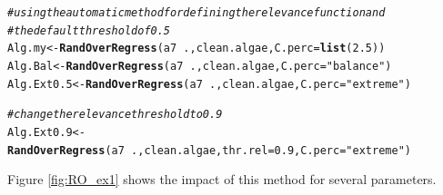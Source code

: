 \documentclass[10pt,a4paper]{article}\usepackage[]{graphicx}\usepackage[]{color}
\makeatletter
\newcommand{\hlnum}[1]{\textcolor[rgb]{0.686,0.059,0.569}{#1}}%
\newcommand{\hlstr}[1]{\textcolor[rgb]{0.192,0.494,0.8}{#1}}%
\newcommand{\hlcom}[1]{\textcolor[rgb]{0.678,0.584,0.686}{\textit{#1}}}%
\newcommand{\hlopt}[1]{\textcolor[rgb]{0,0,0}{#1}}%
\newcommand{\hlstd}[1]{\textcolor[rgb]{0.345,0.345,0.345}{#1}}%
\newcommand{\hlkwb}[1]{\textcolor[rgb]{0.69,0.353,0.396}{#1}}%
\newcommand{\hlkwc}[1]{\textcolor[rgb]{0.333,0.667,0.333}{#1}}%
\newcommand{\hlkwd}[1]{\textcolor[rgb]{0.737,0.353,0.396}{\textbf{#1}}}%
\newenvironment{kframe}{%
 \def\at@end@of@kframe{}%
 \ifinner\ifhmode%
  \def\at@end@of@kframe{\end{minipage}}%
  \begin{minipage}{\columnwidth}%
 \fi\fi%
 \def\FrameCommand##1{\hskip\@totalleftmargin \hskip-\fboxsep
 \colorbox{shadecolor}{##1}\hskip-\fboxsep
     \hskip-\linewidth \hskip-\@totalleftmargin \hskip\columnwidth}%
 \MakeFramed {\advance\hsize-\width
   \@totalleftmargin\z@ \linewidth\hsize
   \@setminipage}}%
 {\par\unskip\endMakeFramed%
 \at@end@of@kframe}
\newenvironment{knitrout}{}{} %
\makeatother
\begin{document}
\begin{knitrout}\footnotesize
{}\color{fgcolor}\begin{kframe}
\begin{alltt}
\hlcom{# using the automatic method for defining the relevance function and}
\hlcom{# the default threshold of 0.5}
\hlstd{Alg.my} \hlkwb{<-} \hlkwd{RandOverRegress}\hlstd{(a7}\hlopt{~}\hlstd{., clean.algae,} \hlkwc{C.perc}\hlstd{=}\hlkwd{list}\hlstd{(}\hlnum{2.5}\hlstd{))}
\hlstd{Alg.Bal} \hlkwb{<-} \hlkwd{RandOverRegress}\hlstd{(a7}\hlopt{~}\hlstd{., clean.algae,} \hlkwc{C.perc}\hlstd{=}\hlstr{"balance"}\hlstd{)}
\hlstd{Alg.Ext0.5} \hlkwb{<-} \hlkwd{RandOverRegress}\hlstd{(a7}\hlopt{~}\hlstd{., clean.algae,} \hlkwc{C.perc}\hlstd{=}\hlstr{"extreme"}\hlstd{)}

\hlcom{# change the relevance threshold to 0.9}
\hlstd{Alg.Ext0.9} \hlkwb{<-} \hlkwd{RandOverRegress}\hlstd{(a7}\hlopt{~}\hlstd{., clean.algae,} \hlkwc{thr.rel}\hlstd{=}\hlnum{0.9}\hlstd{,} \hlkwc{C.perc}\hlstd{=}\hlstr{"extreme"}\hlstd{)}
\end{alltt}
\end{kframe}
\end{knitrout}


Figure \ref{fig:RO_ex1} shows the impact of this method for several parameters.
\end{document}
